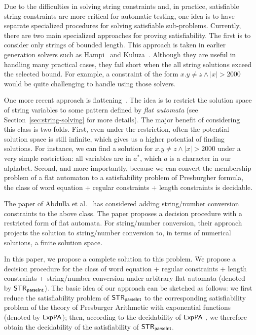 Due to the difficulties in solving string constraints and, in practice, satisfiable string constraints are more critical for automatic testing, one idea is to have separate specialized procedures for solving satisfiable sub-problems. 
Currently, there are two main specialized approaches for proving satisfiability.
The first is to consider only strings of bounded length.
This approach is taken in earlier generation solvers such as Hampi~\cite{KiezunGAGHE12} and Kuluza~\cite{SaxenaAHMMS10}.
Although they are useful in handling many practical cases, they fail short when the all string solutions exceed the selected bound.
For example, a constraint of the form $x.y \neq z  \wedge |x| > 2000$ would be quite challenging to handle using those solvers.

One more recent approach is flattening~\cite{Parosh:20:PLDI,AbdullaACDHRR18,AbdullaACDHRR17}.
The idea is to restrict the solution space of string variables to some pattern defined by \emph{flat automata} (see Section~\ref{sec:string-solving} for more details). 
The major benefit of considering this class is two folds.
First, even under the restriction, often the potential solution space is still infinite, which gives us a higher potential of finding solutions.
For instance, we can find a solution for $x.y \neq z  \wedge |x| > 2000$ under a very simple restriction: all variables are in $a^*$, which $a$ is a character in our alphabet.
Second, and more importantly, because we can convert the membership problem of a flat automaton to a satisfiability problem of Presburgher formula, the class of word equation + regular constraints + length constraints is decidable.

The paper of Abdulla et al.~\cite{Parosh:20:PLDI} has considered adding string/number conversion constraints to the above class.
The paper proposes a decision procedure with a restricted form of flat automata.
For string/number conversion, their approach projects the solution to string/number conversion to, in terms of numerical solutions, a finite solution space.

In this paper, we propose a complete solution to this problem.
We propose a decision procedure for the class of word equation + regular constraints + length constraints + string/number conversion under arbitrary flat automata (denoted by ${\sf STR}_{\textsf{parseInt}}$).
The basic idea of our approach can be sketched as follows: we first reduce the satisfiability problem of ${\sf STR}_{\textsf{parseInt}}$ to the corresponding satisfiability problem of the theory of Presburger Arithmetic with exponential functions (denoted by ${\sf ExpPA}$); then, according to the decidability of ${\sf ExpPA}$ \cite{Semenov84}, we therefore obtain the decidability of the satisfiability of ${\sf STR}_{\textsf{parseInt}}$.  

